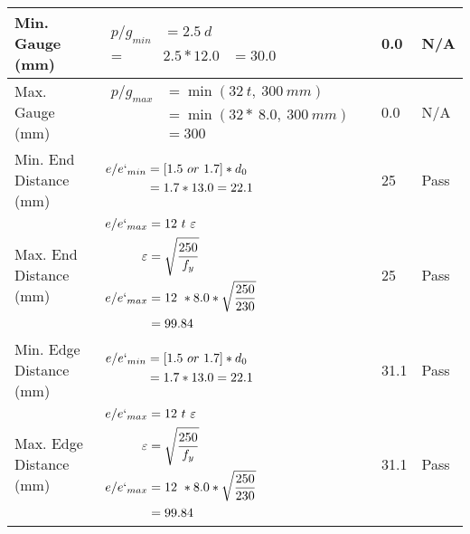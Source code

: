 \documentclass{article}%
\begin{document}
\begin{longtable}{|p{4cm}|p{5cm}|p{5.5cm}|p{1.5cm}|}
\hline%
Min. Gauge (mm)&$\begin{aligned}p/g_{min}&= 2.5 ~ d&\\ =&2.5*12.0&=30.0\end{aligned}$&0.0&N/A\\%
\hline%
Max. Gauge (mm)&$\begin{aligned}p/g_{max} &=\min(32~t,~300~mm)&\\ &=\min(32 *~8.0,~ 300 ~mm)\\&=300\end{aligned}$&0.0&N/A\\%
\hline%
Min. End Distance (mm)&$\begin{aligned}e/e`_{min} &=[1.5~or~ 1.7] * d_0\\ &=1.7*13.0=22.1 \end{aligned}$&25&Pass\\%
\hline%
Max. End Distance (mm)&$\begin{aligned}e/e`_{max} &= 12~ t~ \varepsilon&\\ \varepsilon &= \sqrt{\frac{250}{f_y}}\\ e/e`_{max}&=12 ~*8.0*\sqrt{\frac{250}{230}}\\ &=99.84\\ \end{aligned}$&25&Pass\\%
\hline%
Min. Edge Distance (mm)&$\begin{aligned}e/e`_{min} &=[1.5~or~ 1.7] * d_0\\ &=1.7*13.0=22.1 \end{aligned}$&31.1&Pass\\%
\hline%
Max. Edge Distance (mm)&$\begin{aligned}e/e`_{max} &= 12~ t~ \varepsilon&\\ \varepsilon &= \sqrt{\frac{250}{f_y}}\\ e/e`_{max}&=12 ~*8.0*\sqrt{\frac{250}{230}}\\ &=99.84\\ \end{aligned}$&31.1&Pass\\%
\hline%
\end{longtable}

%
\end{document}
